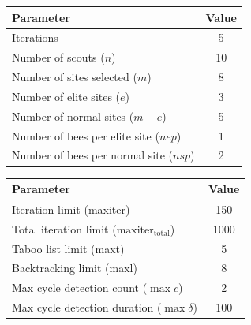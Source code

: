 \documentclass[paper=a4, fontsize=9pt]{scrartcl}
\begin{document}
\begin{multicols}{2}
{
\begin{minipage}{\linewidth{}}
\centering
\begin{tabular}{lc}
\toprule
Parameter                              & Value \\
\midrule
Iterations                             &  5 \\
Number of scouts ($n$)                 & 10 \\
Number of sites selected ($m$)         &  8 \\
Number of elite sites ($e$)            &  3 \\
Number of normal sites ($m-e$)         &  5 \\
Number of bees per elite site ($nep$)  &  1 \\
Number of bees per normal site ($nsp$) &  2 \\
\bottomrule
\end{tabular}
\label{table:baparams}
\end{minipage}
}

{
\begin{minipage}{\linewidth{}}
\centering
\begin{tabular}{lc}
\toprule
Parameter                                             & Value \\
\midrule
Iteration limit (maxiter)                             &   150 \\
Total iteration limit ($\text{maxiter}_\text{total}$) &  1000 \\
Taboo list limit (maxt)                               &     5 \\
Backtracking limit (maxl)                             &     8 \\
Max cycle detection count ($\max c$)                  &     2 \\
Max cycle detection duration ($\max \delta$)          &   100 \\
\bottomrule
\end{tabular}
\label{table:tsparams}
\end{minipage}
}

\end{multicols}



\end{document}
